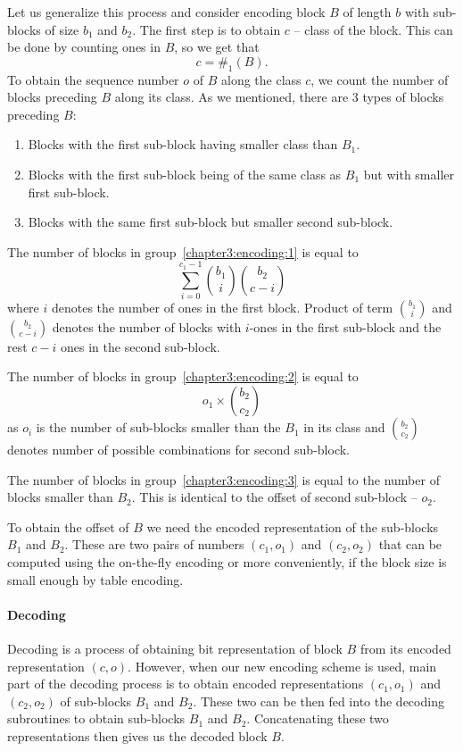 Let us generalize this process and consider encoding block $B$ of length $b$
with sub-blocks of size $b_1$ and $b_2$. The first step is to obtain $c$ --
class of the block. This can be done by counting ones in $B$, so we get that
$$c=\#_1(B).$$ To obtain the sequence number $o$ of $B$ along the class $c$,
we count the number of blocks preceding $B$ along its class. As we mentioned,
there are 3 types of blocks preceding $B$:
\begin{enumerate}
    \item Blocks with the first sub-block having smaller class than $B_1$.
    \label{chapter3:encoding:1}
    \item Blocks with the first sub-block being of the same class as $B_1$
    but with smaller first sub-block. \label{chapter3:encoding:2}
    \item Blocks with the same first sub-block but smaller second sub-block.
    \label{chapter3:encoding:3}
\end{enumerate}

The number of blocks in group~\ref{chapter3:encoding:1} is equal to
$$\sum_{i=0}^{c_1-1} {b_1\choose i} {b_2\choose c-i}$$ where $i$ denotes the number
of ones in the first block. Product of term ${b_1\choose i}$ and ${b_2\choose c-i}$
denotes the number of blocks with $i$-ones in the first sub-block and the rest
$c-i$ ones in the second sub-block.

The number of blocks in group~\ref{chapter3:encoding:2}
is equal to $$o_1\times {b_2\choose c_2}$$ as $o_i$ is the number of sub-blocks smaller
than the $B_1$ in its class and ${b_2\choose c_2}$ denotes number of possible combinations
for second sub-block.

The number of blocks in group~\ref{chapter3:encoding:3} is equal to
the number of blocks smaller than $B_2$. This is identical to the offset of second
sub-block -- $o_2$.

To obtain the offset of $B$ we need the encoded representation
of the sub-blocks $B_1$ and $B_2$. These are two pairs of numbers $(c_1, o_1)$ and $(c_2, o_2)$
that can be computed using the on-the-fly encoding or more conveniently, if the block size is
small enough by table encoding.

\paragraph{Decoding}

Decoding is a process of obtaining bit representation of block $B$ from its encoded
representation $(c, o)$. However, when our new encoding scheme is used, main part
of the decoding process is to obtain encoded representations $(c_1, o_1)$ and
$(c_2, o_2)$ of sub-blocks $B_1$ and $B_2$. These two can be then fed into
the decoding subroutines to obtain sub-blocks $B_1$ and $B_2$. Concatenating these
two representations then gives us the decoded block $B$.

